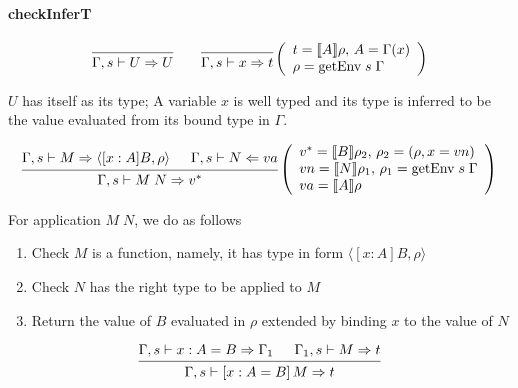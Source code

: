 \documentclass{article}
\theoremstyle{remark}
\begin{document}
\paragraph{checkInferT}
\[
  \begin{prooftree}
    \infer0{\Gamma,s \vdash U \Rightarrow U}
  \end{prooftree} \quad \quad
  \begin{prooftree}
    \infer0{\Gamma,s \vdash x \Rightarrow t}
  \end{prooftree}\left(\begin{array}{l} t = \llbracket A \rrbracket \rho, \, A = \Gamma(x) \\ \rho = \text{getEnv} \; s \; \Gamma\end{array}\right)
\]

$U$ has itself as its type; A variable $x$ is well typed and its type is inferred to be the value evaluated from its bound type in $\Gamma$.

\[
  \begin{prooftree}
    \hypo{\Gamma,s \vdash M \Rightarrow \langle [x : A] B, \rho \rangle}
    \hypo{\Gamma,s \vdash N \Leftarrow va}
    \infer2{\Gamma,s \vdash M \; N \Rightarrow v^*}
  \end{prooftree}\left(\begin{array}
                         {l} v^* = \llbracket B \rrbracket \rho_2, \, \rho_2 = (\rho, x = vn) \\
                         vn = \llbracket N \rrbracket \rho_1, \, \rho_1 = \text{getEnv} \; s \; \Gamma \\
                         va = \llbracket A \rrbracket \rho
                       \end{array}\right)
\]

For application $M \; N$, we do as follows
\begin{enumerate}
  \item Check $M$ is a function, namely, it has type in form $\langle [x : A] B, \rho \rangle$
  \item Check $N$ has the right type to be applied to $M$
  \item Return the value of $B$ evaluated in $\rho$ extended by binding $x$ to the value of $N$ 
\end{enumerate}

\[
  \begin{prooftree}
    \hypo{\Gamma,s \vdash x : A = B \Rightarrow \Gamma_1}
    \hypo{\Gamma_1,s \vdash M \Rightarrow t}
    \infer2{\Gamma,s \vdash [x : A = B]\,M \Rightarrow t}
  \end{prooftree}
\]
\end{document}
